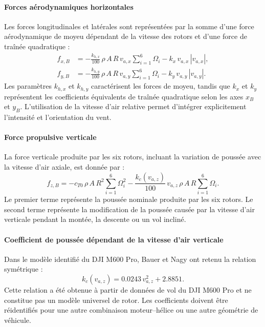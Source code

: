 \documentclass[11pt,a4paper,oneside]{report}
\begin{document}
	
	
	
	\paragraph{Forces aérodynamiques horizontales}
	Les forces longitudinales et latérales sont représentées par la somme d'une force aérodynamique de moyeu dépendant de la vitesse des rotors et d'une force de traînée quadratique :
	\begin{align}
		f_{x,B}&=-\frac{k_{h,x}}{100}\,\rho\,A\,R\,v_{a,x}\sum_{i=1}^{6}\Omega_i-k_x\,v_{a,x}\,|v_{a,x}|,\label{eq_longitudinal_aero_force}\\
		f_{y,B}&=-\frac{k_{h,y}}{100}\,\rho\,A\,R\,v_{a,y}\sum_{i=1}^{6}\Omega_i-k_y\,v_{a,y}\,|v_{a,y}|.\label{eq_lateral_aero_force}
	\end{align}
	Les paramètres \(k_{h,x}\) et \(k_{h,y}\) caractérisent les forces de moyeu, tandis que \(k_x\) et \(k_y\) représentent les coefficients équivalents de traînée quadratique selon les axes \(x_B\) et \(y_B\). L'utilisation de la vitesse d'air relative permet d'intégrer explicitement l'intensité et l'orientation du vent.
	
	\paragraph{Force propulsive verticale}
	La force verticale produite par les six rotors, incluant la variation de poussée avec la vitesse d'air axiale, est donnée par :
	\begin{equation}
		f_{z,B}=-c_{T0}\,\rho\,A\,R^2\sum_{i=1}^{6}\Omega_i^2-\frac{k_c(v_{a,z})}{100}\,v_{a,z}\,\rho\,A\,R\sum_{i=1}^{6}\Omega_i.
		\label{eq_vertical_body_force}
	\end{equation}
	Le premier terme représente la poussée nominale produite par les six rotors. Le second terme représente la modification de la poussée causée par la vitesse d'air verticale pendant la montée, la descente ou un vol incliné.
	
	\paragraph{Coefficient de poussée dépendant de la vitesse d'air verticale}
	Dans le modèle identifié du DJI M600 Pro, Bauer et Nagy ont retenu la relation symétrique :
	\begin{equation}
		k_c(v_{a,z})=0.0243\,v_{a,z}^{2}+2.8851.
		\label{eq_vertical_thrust_coefficient}
	\end{equation}
	Cette relation a été obtenue à partir de données de vol du DJI M600 Pro et ne constitue pas un modèle universel de rotor. Les coefficients doivent être réidentifiés pour une autre combinaison moteur--hélice ou une autre géométrie de véhicule.
	
\end{document}
